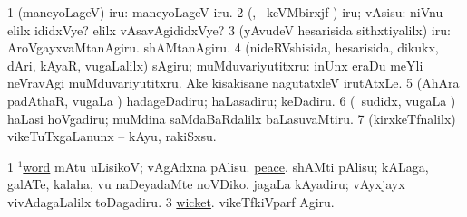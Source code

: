 \noindent
\gl{\akirx}
\bmng
\bnum
\num{1} (maneyoLageV) iru:  maneyoLageV iru. 
\num{2} (\AmA, \kanmu\ keVMbirxjf \vivi) iru; vAsisu:  niVnu elilx ididxVye? elilx vAsavAgididxVye? 
\num{3} (yAvudeV hesarisida sithxtiyalilx) iru:  AroVgayxvaMtanAgiru.  shAMtanAgiru. 
\num{4} (nideRVshisida, hesarisida, dikukx, dAri, kAyaR, \mo vugaLalilx) sAgiru; muMduvariyutitxru:  inUnx eraDu meYli neVravAgi muMduvariyutitxru.  Ake kisakisane nagutatxleV irutAtxLe. 
\num{5} (AhAra padAthaR, \mo vugaLa \vi) hadageDadiru; haLasadiru; keDadiru. 
\num{6} (\rUpa\ sudidx, \mo vugaLa \vi) haLasi hoVgadiru; muMdina saMdaBaRdalilx baLasuvaMtiru. 
\num{7} (kirxkeTfnalilx) vikeTuTxgaLanunx -- kAyu, rakiSxsu. 
\enum
\emng

\noindent
\gl{\pagu}
\bmng
\bnum
\num{1}  \hyperref{kandict_w.pdf}{W}{word(1) pagu(16)}{$^1$word} mAtu uLisikoV; vAgAdxna pAlisu. 
  \hyperref{kandict_p.pdf}{P}{peace pagu(7)}{peace}. 
\banum
{} shAMti pAlisu; kALaga, galATe, kalaha, \mo vu naDeyadaMte noVDiko. 
 jagaLa kAyadiru; vAyxjayx vivAdagaLalilx toDagadiru. 
\eanum
\numie
\num{3}  \hyperref{kandict_w.pdf}{W}{wicket pagu(5)}{wicket}. vikeTfkiVparf Agiru. 
\enum
\emng

